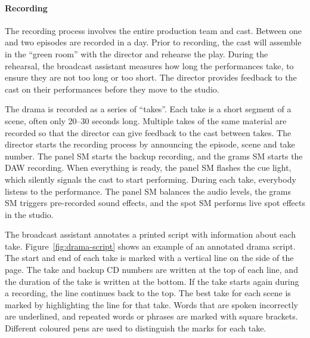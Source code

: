 \paragraph{Recording}
The recording process involves the entire production team and cast. Between one and two episodes are recorded in a day.
Prior to recording, the cast will assemble in the ``green room'' with the director and rehearse the play. During the
rehearsal, the broadcast assistant measures how long the performances take, to ensure they are not too long or too
short.  The director provides feedback to the cast on their performances before they move to the studio.

The drama is recorded as a series of ``takes''. Each take is a short segment of a scene, often only
20--30 seconds long.  Multiple takes of the same material are recorded so that the director can give feedback to the
cast between takes.  The director starts the recording process by announcing the episode, scene and take number.  The
panel SM starts the backup recording, and the grams SM starts the DAW recording. When everything is ready, the panel SM
flashes the cue light, which silently signals the cast to start performing.  During each take, everybody listens to the
performance. The panel SM balances the audio levels, the grams SM triggers pre-recorded sound effects, and the spot SM
performs live spot effects in the studio.

The broadcast assistant annotates a printed script with information about each take.  Figure~\ref{fig:drama-script}
shows an example of an annotated drama script.  The start and end of each take is marked with a vertical line on the
side of the page. The take and backup CD numbers are written at the top of each line, and the duration of the take is
written at the bottom.  If the take starts again during a recording, the line continues back to the top.  The best take
for each scene is marked by highlighting the line for that take.  Words that are spoken incorrectly are underlined, and
repeated words or phrases are marked with square brackets.  Different coloured pens are used to distinguish the marks
for each take.  

